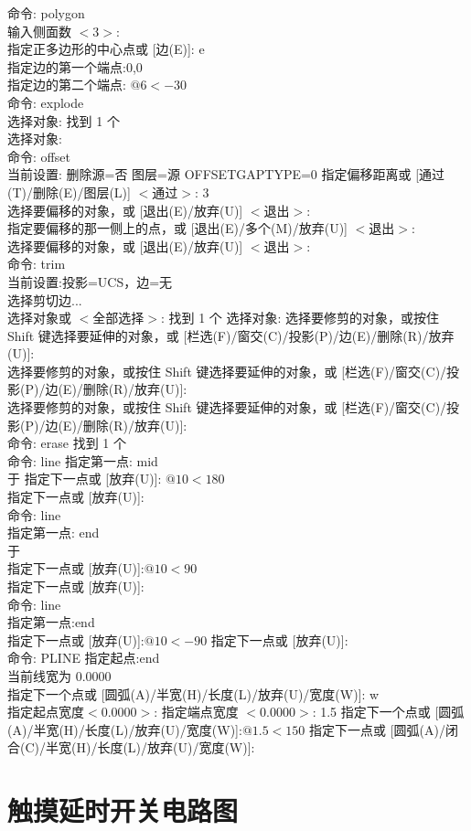 \noindent
命令: polygon \\
输入侧面数 $<3>$:\\
指定正多边形的中心点或 [边(E)]: e\\
指定边的第一个端点:0,0\\
指定边的第二个端点: $@6<-30$\\
命令: explode\\
选择对象: 找到 1 个\\
选择对象:\\
命令: offset\\
当前设置: 删除源=否  图层=源  OFFSETGAPTYPE=0
指定偏移距离或 [通过(T)/删除(E)/图层(L)] $<$通过$>$: 3\\
选择要偏移的对象，或 [退出(E)/放弃(U)] $<$退出$>$:\\
指定要偏移的那一侧上的点，或 [退出(E)/多个(M)/放弃(U)] $<$退出$>$:\\
选择要偏移的对象，或 [退出(E)/放弃(U)] $<$退出$>$:\\
命令: trim\\
当前设置:投影=UCS，边=无\\
选择剪切边...\\
选择对象或 $<$全部选择$>$:  找到 1 个
选择对象:
选择要修剪的对象，或按住 Shift 键选择要延伸的对象，或
[栏选(F)/窗交(C)/投影(P)/边(E)/删除(R)/放弃(U)]:\\
选择要修剪的对象，或按住 Shift 键选择要延伸的对象，或
[栏选(F)/窗交(C)/投影(P)/边(E)/删除(R)/放弃(U)]:\\
选择要修剪的对象，或按住 Shift 键选择要延伸的对象，或
[栏选(F)/窗交(C)/投影(P)/边(E)/删除(R)/放弃(U)]:\\
命令: erase 找到 1 个\\
命令: line 指定第一点: mid\\
于
指定下一点或 [放弃(U)]: $@10<180$\\
指定下一点或 [放弃(U)]:\\
命令: line\\
指定第一点: end\\
于\\
指定下一点或 [放弃(U)]:$ @10<90$\\
指定下一点或 [放弃(U)]:\\
命令: line\\
指定第一点:end\\
指定下一点或 [放弃(U)]:$ @10<-90$
指定下一点或 [放弃(U)]:\\
命令: PLINE
指定起点:end\\
当前线宽为 0.0000\\
指定下一个点或 [圆弧(A)/半宽(H)/长度(L)/放弃(U)/宽度(W)]: w\\
指定起点宽度$ <$0.0000$>$:
指定端点宽度 $<$0.0000$>$: 1.5
指定下一个点或 [圆弧(A)/半宽(H)/长度(L)/放弃(U)/宽度(W)]:$ @1.5<150$
指定下一点或 [圆弧(A)/闭合(C)/半宽(H)/长度(L)/放弃(U)/宽度(W)]:\\

\section{触摸延时开关电路图}
\endinput